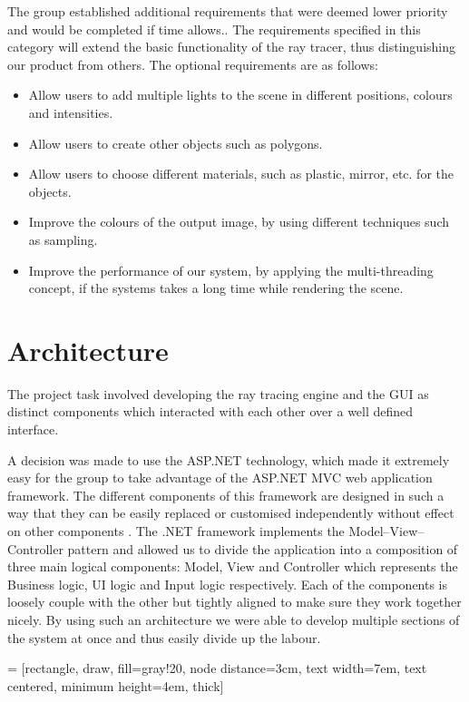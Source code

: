 \documentclass[a4paper]{report}
\begin{document}
	The group established additional requirements that were deemed lower priority and would be completed if time allows..
	The requirements specified in this category will extend the basic functionality of the ray tracer, thus distinguishing our product from others. The optional requirements are as follows:
	\begin{itemize}
		\item Allow users to add multiple lights to the scene in different positions, colours and intensities.
		\item Allow users to create other objects such as polygons.
		\item Allow users to choose different materials, such as plastic, mirror, etc. for the objects.
		\item Improve the colours of the output image, by using different techniques such as sampling.
		\item Improve the performance of our system, by applying the multi-threading concept, if the systems takes a long time while rendering the scene.
	\end{itemize}
	
	\section{Architecture}
	\label{sssec:arch}
	The project task involved developing the ray tracing engine and the GUI as distinct components which interacted with each other over a well defined interface.
	
	A decision was made to use the ASP.NET technology, which made it extremely easy for the group to take advantage of the ASP.NET MVC web application framework. The different components of this framework are designed in such a way that they can be easily replaced or customised independently without effect on other components \cite{microsoft_asp.net_2018}. The .NET framework implements the Model–View–Controller pattern and allowed us to divide the application into a composition of three main logical components: Model, View and Controller which represents the Business logic, UI logic and Input logic respectively. Each of the components is loosely couple with the other but tightly aligned to make sure they work together nicely. By using such an architecture we were able to develop multiple sections of the system at once and thus easily divide up the labour. 
	
	 = [rectangle, draw, fill=gray!20, node distance=3cm, text width=7em, text centered, minimum height=4em, thick]
	
\end{document}
